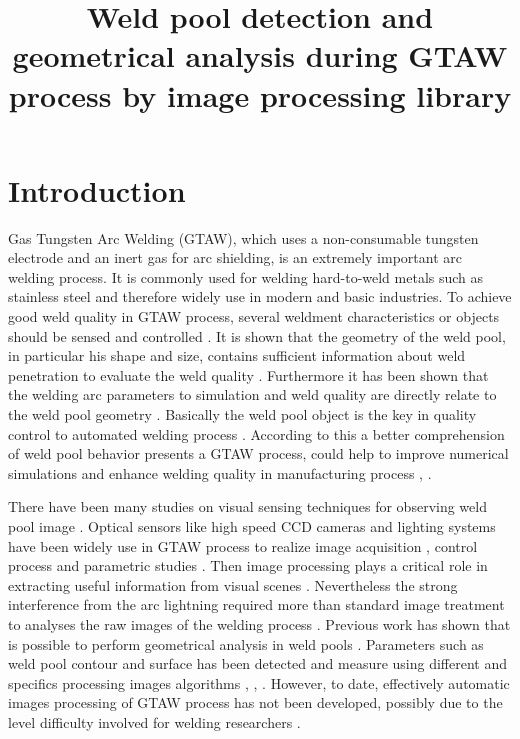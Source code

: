 \title{ Weld pool detection and geometrical analysis during GTAW process by image processing library}


\section{Introduction}

Gas Tungsten Arc Welding (GTAW), which uses a non-consumable tungsten 
electrode and an inert gas for arc shielding, is an extremely 
important arc welding process. It is commonly used for welding hard-to-weld
 metals such as stainless steel \cite{JUANG} and therefore widely use in 
modern and basic industries. To achieve good weld quality in GTAW process,
 several weldment characteristics or objects should be sensed and
 controlled \cite{DOUMANIDIS}. It is shown that the geometry of the weld 
pool, in particular his shape and size, contains sufficient information
 about weld penetration to evaluate the weld quality \cite{ZHANG}.
 Furthermore it has been shown that the welding arc parameters to 
simulation and weld quality are directly relate to the weld pool 
geometry \cite{LU}.
Basically the weld pool object is the key in quality control 
to automated welding process \cite{KOVACEVIC}. 
According to this a better comprehension of weld pool behavior
 presents a GTAW process, could help to improve numerical 
simulations and enhance welding quality in manufacturing 
process \cite{LIN}, \cite{WU1}. 

There have been many studies on visual sensing techniques
 for observing weld pool image \cite{BAE}. Optical sensors
 like high speed CCD cameras and lighting systems have been
 widely use in GTAW process to realize image acquisition 
\cite{GUANGJUN}, control process \cite{BAE} and parametric 
studies \cite{BALSAMO}. Then image processing plays a critical
 role in extracting useful information from visual scenes 
\cite{WANG}. Nevertheless the strong interference from the
 arc lightning required more than standard image treatment
 to analyses the raw images of the welding process 
\cite{NORDBRUCH}. Previous work has shown that is possible
 to perform geometrical analysis in weld pools \cite{WU1}.
 Parameters such as weld pool contour and surface has been
 detected and measure using different and specifics processing 
images algorithms \cite{KOVACEVIC}, \cite{WU1}, \cite{SAEED}.
 However, to date, effectively automatic images processing 
of GTAW process has not been developed, possibly due to the
 level difficulty involved for welding researchers \cite{WANG}.

